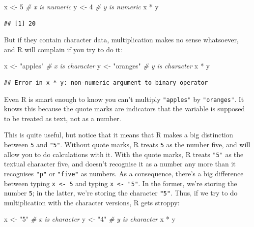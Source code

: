 \documentclass[
]{book}
\newenvironment{Shaded}{\begin{snugshade}}{\end{snugshade}}
\newcommand{\CommentTok}[1]{\textcolor[rgb]{0.56,0.35,0.01}{\textit{#1}}}
\newcommand{\DecValTok}[1]{\textcolor[rgb]{0.00,0.00,0.81}{#1}}
\newcommand{\NormalTok}[1]{#1}
\newcommand{\OtherTok}[1]{\textcolor[rgb]{0.56,0.35,0.01}{#1}}
\newcommand{\SpecialCharTok}[1]{\textcolor[rgb]{0.00,0.00,0.00}{#1}}
\newcommand{\StringTok}[1]{\textcolor[rgb]{0.31,0.60,0.02}{#1}}
\begin{document}
\begin{Shaded}
\begin{Highlighting}[]
\NormalTok{x }\OtherTok{\textless{}{-}} \DecValTok{5}   \CommentTok{\# x is numeric}
\NormalTok{y }\OtherTok{\textless{}{-}} \DecValTok{4}   \CommentTok{\# y is numeric}
\NormalTok{x }\SpecialCharTok{*}\NormalTok{ y    }
\end{Highlighting}
\end{Shaded}

\begin{verbatim}
## [1] 20
\end{verbatim}

But if they contain character data, multiplication makes no sense whatsoever, and R will complain if you try to do it:

\begin{Shaded}
\begin{Highlighting}[]
\NormalTok{x }\OtherTok{\textless{}{-}} \StringTok{"apples"}   \CommentTok{\# x is character}
\NormalTok{y }\OtherTok{\textless{}{-}} \StringTok{"oranges"}  \CommentTok{\# y is character}
\NormalTok{x }\SpecialCharTok{*}\NormalTok{ y           }
\end{Highlighting}
\end{Shaded}

\begin{verbatim}
## Error in x * y: non-numeric argument to binary operator
\end{verbatim}

Even R is smart enough to know you can't multiply \texttt{"apples"} by \texttt{"oranges"}. It knows this because the quote marks are indicators that the variable is supposed to be treated as text, not as a number.

This is quite useful, but notice that it means that R makes a big distinction between \texttt{5} and \texttt{"5"}. Without quote marks, R treats \texttt{5} as the number five, and will allow you to do calculations with it. With the quote marks, R treats \texttt{"5"} as the textual character five, and doesn't recognise it as a number any more than it recognises \texttt{"p"} or \texttt{"five"} as numbers. As a consequence, there's a big difference between typing \texttt{x\ \textless{}-\ 5} and typing \texttt{x\ \textless{}-\ "5"}. In the former, we're storing the number \texttt{5}; in the latter, we're storing the character \texttt{"5"}. Thus, if we try to do multiplication with the character versions, R gets stroppy:

\begin{Shaded}
\begin{Highlighting}[]
\NormalTok{x }\OtherTok{\textless{}{-}} \StringTok{"5"}   \CommentTok{\# x is character}
\NormalTok{y }\OtherTok{\textless{}{-}} \StringTok{"4"}   \CommentTok{\# y is character}
\NormalTok{x }\SpecialCharTok{*}\NormalTok{ y     }
\end{Highlighting}
\end{Shaded}
\end{document}
